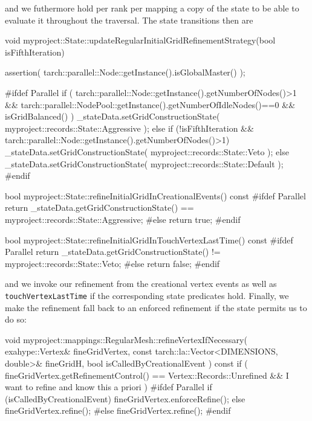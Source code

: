 \noindent
and we futhermore hold per rank per mapping a copy of the state to be able to
evaluate it throughout the traversal.
The state transitions then are
\begin{code}
void myproject::State::updateRegularInitialGridRefinementStrategy(bool isFifthIteration) { 
  assertion( tarch::parallel::Node::getInstance().isGlobalMaster() );

  #ifdef Parallel
  if (
    tarch::parallel::Node::getInstance().getNumberOfNodes()>1
    &&
    tarch::parallel::NodePool::getInstance().getNumberOfIdleNodes()==0
    &&
    isGridBalanced()
  ) {
    _stateData.setGridConstructionState( myproject::records::State::Aggressive );
  }
  else if (!isFifthIteration && tarch::parallel::Node::getInstance().getNumberOfNodes()>1) {
    _stateData.setGridConstructionState( myproject::records::State::Veto );
  }
  else {
    _stateData.setGridConstructionState( myproject::records::State::Default );
  }
  #endif
}

bool myproject::State::refineInitialGridInCreationalEvents() const {
  #ifdef Parallel
  return _stateData.getGridConstructionState() == myproject::records::State::Aggressive;
  #else
  return true;
  #endif
}

bool myproject::State::refineInitialGridInTouchVertexLastTime() const {
  #ifdef Parallel
  return _stateData.getGridConstructionState() != myproject::records::State::Veto;
  #else
  return false;
  #endif
}
\end{code}

\noindent
and we invoke our refinement from the creational vertex events as well as
\texttt{touchVertexLastTime} if the corresponding state predicates hold.
Finally, we make the refinement fall back to an enforced refinement if the state
permits us to do so:
\begin{code}
void myproject::mappings::RegularMesh::refineVertexIfNecessary(
  exahype::Vertex&                              fineGridVertex,
  const tarch::la::Vector<DIMENSIONS, double>&  fineGridH,
  bool                                          isCalledByCreationalEvent
) const {
  if (
    fineGridVertex.getRefinementControl() == Vertex::Records::Unrefined
    &&
    I want to refine and know this a priori
  ) {
    #ifdef Parallel
    if (isCalledByCreationalEvent) {
      fineGridVertex.enforceRefine();
    }
    else {
      fineGridVertex.refine();
    }
    #else
    fineGridVertex.refine();
    #endif
  }
}
\end{code}






